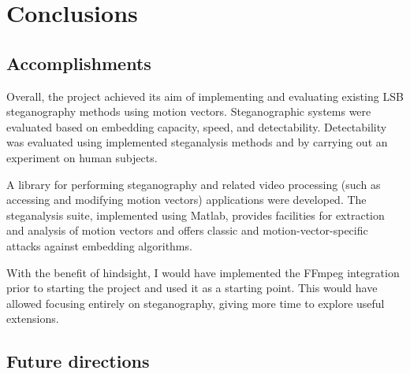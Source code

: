 \documentclass[12pt,british,twoside,notitlepage,usenames,dvipsnames,hypens,final]{report}
\numberwithin{equation}{section}
\numberwithin{figure}{section}
\begin{document}
\cleardoublepage
\chapter{Conclusions}

\section{Accomplishments}

Overall, the project achieved its aim of implementing and evaluating existing LSB steganography methods using motion vectors. Steganographic systems were evaluated based on embedding capacity, speed, and detectability. Detectability was evaluated using implemented steganalysis methods and by carrying out an experiment on human subjects.

A library for performing steganography and related video processing (such as accessing and modifying motion vectors) applications were developed. The steganalysis suite, implemented using Matlab, provides facilities for extraction and analysis of motion vectors and offers classic and motion-vector-specific attacks against embedding algorithms.

With the benefit of hindsight, I would have implemented the FFmpeg integration prior to starting the project and used it as a starting point. This would have allowed focusing entirely on steganography, giving more time to explore useful extensions.

\section{Future directions}
\end{document}
